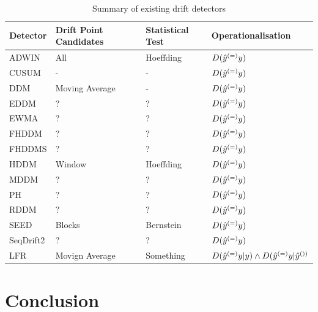 \begin{table}[]
    \centering
    \begin{tabular}{|l|l|l|l|}
         \toprule
         Detector & Drift Point Candidates & Statistical Test & Operationalisation  \\
         \midrule
         ADWIN & All & Hoeffding & $D(\hat{y}^{(=)}y)$ \\
         CUSUM & - & - & $D(\hat{y}^{(=)}y)$ \\
         DDM & Moving Average & - & $D(\hat{y}^{(=)}y)$ \\
         EDDM & ? & ? & $D(\hat{y}^{(=)}y)$ \\
         EWMA & ? & ? & $D(\hat{y}^{(=)}y)$ \\
         FHDDM & ? & ? & $D(\hat{y}^{(=)}y)$ \\
         FHDDMS & ? & ? & $D(\hat{y}^{(=)}y)$ \\
         HDDM & Window & Hoeffding & $D(\hat{y}^{(=)}y)$ \\ 
         MDDM & ? & ? & $D(\hat{y}^{(=)}y)$ \\
         PH & ? & ? & $D(\hat{y}^{(=)}y)$ \\
         RDDM & ? & ? & $D(\hat{y}^{(=)}y)$ \\
         SEED & Blocks & Bernstein & $D(\hat{y}^{(=)}y)$ \\ 
         SeqDrift2 & ? & ? & $D(\hat{y}^{(=)}y)$ \\
         LFR & Movign Average & Something & $D(\hat{y}^{(=)}y|y) \land D(\hat{y}^{(=)}y|\hat{y}^{())}$  \\
         \bottomrule
    \end{tabular}
    \caption{Summary of existing drift detectors}
    \label{tab:drift_detectors}
\end{table}


\section{Conclusion} \label{background:conclusion}


